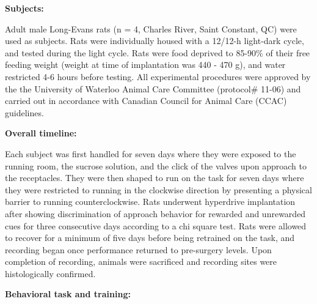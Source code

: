 \documentclass[11pt]{article}
\begin{document}
{\bf Subjects:}

Adult male Long-Evans rats (n = 4, Charles River, Saint Constant, QC) were used as subjects. Rats were individually housed with a 12/12-h light-dark cycle, and tested during the light cycle. Rats were food deprived to 85-90\% of their free feeding weight (weight at time of implantation was 440 - 470 g), and water restricted 4-6 hours before testing. All experimental procedures were approved by the the University of Waterloo Animal Care Committee (protocol\# 11-06) and carried out in accordance with Canadian Council for Animal Care (CCAC) guidelines. 

{\bf Overall timeline:}

Each subject was first handled for seven days where they were exposed to the running room, the sucrose solution, and the click of the valves upon approach to the receptacles. They were then shaped to run on the task for seven days where they were restricted to running in the clockwise direction by presenting a physical barrier to running counterclockwise. Rats underwent hyperdrive implantation after showing discrimination of approach behavior for rewarded and unrewarded cues for three consecutive days according to a chi square test. Rats were allowed to recover for a minimum of five days before being retrained on the task, and recording began once performance returned to pre-surgery levels. Upon completion of recording, animals were sacrificed and recording sites were histologically confirmed.

{\bf Behavioral task and training:} 
\end{document}
